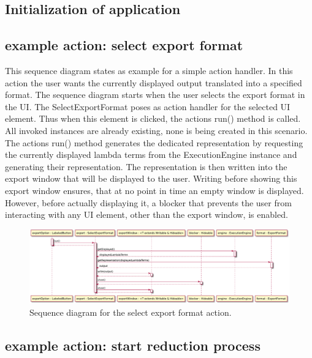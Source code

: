 \subsection{Initialization of application}

\subsection{example action: select export format}
This sequence diagram states as example for a simple action handler.
In this action the user wants the currently displayed output translated into a specified format. The sequence diagram starts when the user selects the export format in the UI. 
The SelectExportFormat poses as action handler for the selected UI element. Thus when this element is clicked, the actions run() method is called. All invoked instances are already existing, none is being created in this scenario.
The actions run() method generates the dedicated representation by requesting the currently displayed lambda terms from the ExecutionEngine instance and generating their representation.
The representation is then written into the export window that will be displayed to the user. Writing before showing this export window ensures, that at no point in time an empty window is displayed.
However, before actually displaying it, a blocker that prevents the user from interacting with any UI element, other than the export window, is enabled.

\begin{figure}[H]
	\centering
	\includegraphics[width=\textwidth]{sequenceDiagrams/exportOutput}
	\caption{Sequence diagram for the select export format action.}
\end{figure}

\subsection{example action: start reduction process}

